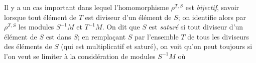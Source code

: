 Il y a un cas important dans lequel l'homomorphisme $\rho^{T,S}$ est \emph{bijectif}, savoir lorsque tout élément de $T$ est diviseur d'un élément de $S$; on identifie alors par $\rho^{T,S}$ les modules $S^{-1} M$ et $T^{-1} M$. On dit que $S$ est \emph{saturé} si tout diviseur d'un élément de $S$ est dans $S$; en remplaçant $S$ par l'ensemble $T$ de tous les diviseurs des éléments de $S$ (qui est multiplicatif et saturé), on voit qu'on peut toujours si l'on veut se limiter à la considération de modules $S^{-1} M$ où

\newpage
